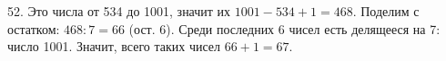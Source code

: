 52. Это числа от 534 до 1001, значит их $1001-534+1=468.$ Поделим с остатком: $468:7=66$ (ост. 6). Среди последних 6 чисел есть делящееся на 7: число 1001. Значит, всего таких чисел $66+1=67.$\\
